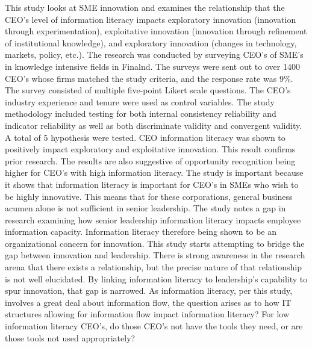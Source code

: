 \begin{adjustwidth}{1in}{}
  \begin{hangpara}{.25in}{1}
\end{hangpara}
\end{adjustwidth}
This study looks at SME innovation and examines the relationship that the CEO's level of information literacy impacts exploratory innovation (innovation through experimentation), exploitative innovation (innovation through refinement of institutional knowledge), and exploratory innovation (changes in technology, markets, policy, etc.). The research was conducted by surveying CEO's of SME's in knowledge intensive fields in Finalnd. The surveys were sent out to over 1400 CEO's whose firms matched the study criteria, and the response rate was 9\%. The survey consisted of multiple five-point Likert scale questions. The CEO's industry experience and tenure were used as control variables. The study methodology included testing for both internal consistency reliability and indicator reliability as well as both discriminate validity and convergent validity. A total of 5 hypothesis were tested. CEO information literacy was shown to positively impact exploratory and exploitative innovation. This result confirms prior research. The results are also suggestive of opportunity recognition being higher for CEO's with high information literacy. The study is important because it shows that information literacy is important for CEO's in SMEs who wish to be highly innovative. This means that for these corporations, general business acumen alone is not sufficient in senior leadership. The study notes a gap in research examining how senior leadership information literacy impacts employee information capacity. Information literacy therefore being shown to be an organizational concern for innovation. This study starts attempting to bridge the gap between innovation and leadership. There is strong awareness in the research arena that there exists a relationship, but the precise nature of that relationship is not well elucidated. By linking information literacy to leadership's capability to spur innovation, that gap is narrowed. As information literacy, per this study, involves a great deal about information flow, the question arises as to how IT structures allowing for information flow impact information literacy? For low information literacy CEO's, do those CEO's not have the tools they need, or are those tools not used appropriately?

